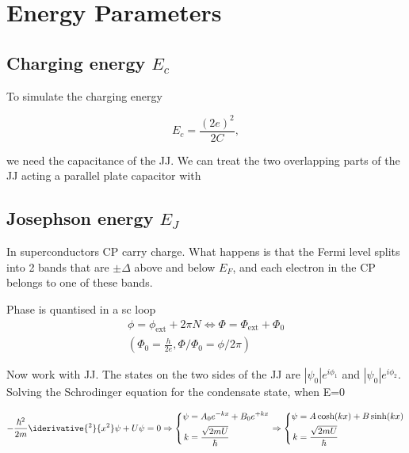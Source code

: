 \section{Energy Parameters\label{app:energy_parameters}}
 \subsection{Charging energy $ E_c $}
 To simulate the charging energy
 
 \begin{equation}\label{eqn:sim_1}
 	E_c = \frac{(2e)^2}{2C},
 \end{equation}
 
 \noindent we need the capacitance of the JJ. We can treat the two overlapping parts of the JJ acting a parallel plate capacitor with 
 
 
 \subsection{Josephson energy $ E_J $}
     In superconductors CP carry charge. What happens is that the Fermi level splits into 2 bands that are $\pm\Delta$ above and below $E_F$, and each electron in the CP belongs to one of these bands. 
  
  
  {{ Phase is quantised in a sc loop
  		\begin{equation}
  		\begin{aligned}
  		\phi = \phi_\text{ext} + 2\pi N \Leftrightarrow \Phi = \Phi_\text{ext} + \Phi_0 \\(\Phi_0 = \frac{h}{2e}, \Phi/\Phi_0=\phi/2\pi)
  		\end{aligned}
  		\end{equation}
  }}
  
  Now work with JJ. The states on the two sides of the JJ are $\left|\psi_0\right|e^{i\phi_1}$ and $\left|\psi_0\right|e^{i\phi_2}$. Solving the Schrodinger equation for the condensate state, when E=0
  
  \begin{equation}
  -\frac{\hbar^2}{2m}\iderivative{^2}{x^2}\psi+U\psi = 0 \Rightarrow
  \left\lbrace\begin{aligned}
  \psi & = A_0e^{-kx}+B_0e^{+kx}\\
  k & = \frac{\sqrt{2mU}}{\hbar}
  \end{aligned} \right. \Rightarrow
  \left\lbrace\begin{aligned}
  \psi & = A\cosh(kx)+B\sinh(kx)\\
  k & = \frac{\sqrt{2mU}}{\hbar}
  \end{aligned} \right.
  \end{equation}
  
